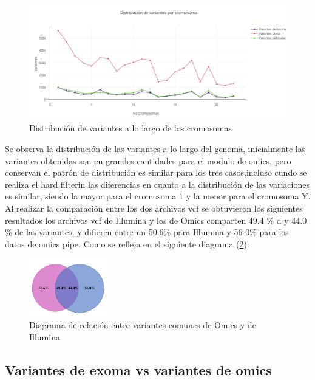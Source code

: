 \begin{figure}[H]
	\centering
	\includegraphics[width=1\textwidth]{Kap2/variaciones}
	\caption{Distribución de variantes a lo largo de los cromosomas} \label{fig:distribucion}
\end{figure}

Se observa la distribución de las variantes a lo largo del genoma, inicialmente las variantes obtenidas son en grandes cantidades para el modulo de omics, pero conservan el patrón de distribución es similar para los tres casos,incluso cundo se realiza el hard filterin las diferencias en cuanto a la distribución de las variaciones es similar, siendo la mayor para el cromosoma 1 y la menor para el cromosoma Y. \\

Al realizar la comparación entre los dos archivos vcf se obtuvieron los siguientes resultados los archivos vcf de Illumina y los de Omics comparten 49.4 \% d y 44.0 \% de las variantes, y difieren entre un 50.6\% para Illumina y 56-0\% para los datos de omics pipe. Como se refleja en el siguiente diagrama (\ref{fig:diagrama}):

\begin{figure}[H]
	\centering
	\includegraphics[width=0.3\textwidth]{Kap2/validacion2}
	\caption{Diagrama de relación entre variantes comunes de Omics y de Illumina} \label{fig:diagrama}
\end{figure}

\subsection*{Variantes de exoma vs variantes de omics}

